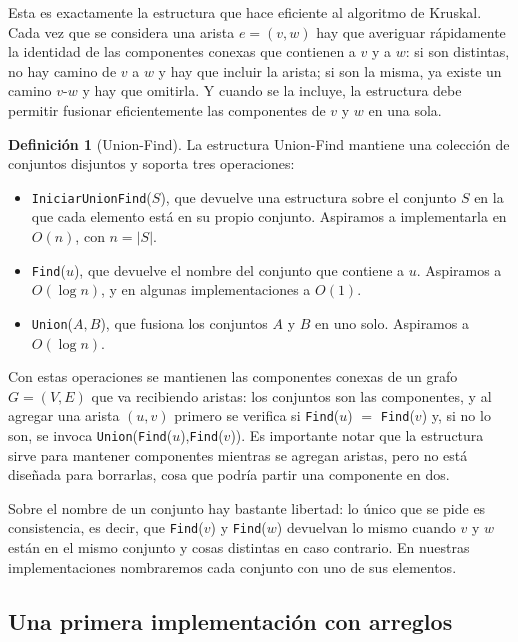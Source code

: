 \documentclass[12pt, spanish, oneside, openany]{book}
\theoremstyle{uprightplain}
\theoremstyle{definition}
\newtheorem{definicion}[teorema]{Definición}
\theoremstyle{remark}
\theoremstyle{definition}
\begin{document}
Esta es exactamente la estructura que hace eficiente al algoritmo de Kruskal. Cada vez que se considera una arista $e=(v,w)$ hay que averiguar rápidamente la identidad de las componentes conexas que contienen a $v$ y a $w$: si son distintas, no hay camino de $v$ a $w$ y hay que incluir la arista; si son la misma, ya existe un camino $v$-$w$ y hay que omitirla. Y cuando se la incluye, la estructura debe permitir fusionar eficientemente las componentes de $v$ y $w$ en una sola.

\begin{definicion}[Union-Find]
\label{def:union-find}
La estructura Union-Find mantiene una colección de conjuntos disjuntos y soporta tres operaciones:
\begin{itemize}
    \item \texttt{IniciarUnionFind}($S$), que devuelve una estructura sobre el conjunto $S$ en la que cada elemento está en su propio conjunto. Aspiramos a implementarla en $O(n)$, con $n=|S|$.
    \item \texttt{Find}($u$), que devuelve el nombre del conjunto que contiene a $u$. Aspiramos a $O(\log n)$, y en algunas implementaciones a $O(1)$.
    \item \texttt{Union}($A,B$), que fusiona los conjuntos $A$ y $B$ en uno solo. Aspiramos a $O(\log n)$.
\end{itemize}
\end{definicion}

Con estas operaciones se mantienen las componentes conexas de un grafo $G=(V,E)$ que va recibiendo aristas: los conjuntos son las componentes, y al agregar una arista $(u,v)$ primero se verifica si \texttt{Find}($u$) $=$ \texttt{Find}($v$) y, si no lo son, se invoca \texttt{Union}(\texttt{Find}($u$),\texttt{Find}($v$)). Es importante notar que la estructura sirve para mantener componentes mientras se agregan aristas, pero no está diseñada para borrarlas, cosa que podría partir una componente en dos.

Sobre el nombre de un conjunto hay bastante libertad: lo único que se pide es consistencia, es decir, que \texttt{Find}($v$) y \texttt{Find}($w$) devuelvan lo mismo cuando $v$ y $w$ están en el mismo conjunto y cosas distintas en caso contrario. En nuestras implementaciones nombraremos cada conjunto con uno de sus elementos.

\subsection{Una primera implementación con arreglos}
\end{document}

